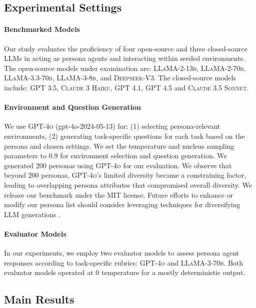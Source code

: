 \subsection{Experimental Settings}

\paragraph{Benchmarked Models}
Our study evaluates the proficiency of four open-source and three closed-source LLMs in acting as persona agents and interacting within seeded environments. The open-source models under examination are: \textsc{LLaMA-2-13b}, \textsc{LLaMA-2-70b}, \textsc{LLaMA-3.3-70b}, \textsc{LLaMA-3-8b}, and \textsc{Deepseek-V3}. The closed-source models include: \textsc{GPT 3.5}, \textsc{Claude 3 Haiku}, \textsc{GPT 4.1}, \textsc{GPT 4.5} and \textsc{Claude 3.5 Sonnet}.

\paragraph{Environment and Question Generation} We use \textsc{GPT-4o} (gpt-4o-2024-05-13) for: (1) selecting persona-relevant environments, (2) generating task-specific questions for each \benchmark task based on the persona and chosen settings. We set the temperature and nucleus sampling parameters to 0.9 for environment selection and question generation. We generated 200 personas using \textsc{GPT-4o} for our evaluation. We observe that beyond 200 personas, \textsc{GPT-4o}'s limited diversity became a constraining factor, leading to overlapping persona attributes that compromised overall diversity. We release our benchmark under the MIT license. Future efforts to enhance or modify our persona list should consider leveraging techniques for diversifying LLM generations \cite{zhang2024forcing}.

\paragraph{Evaluator Models} In our experiments, we employ two evaluator models to assess persona agent responses according to task-specific rubrics: \textsc{GPT-4o} and \textsc{LLaMA-3-70b}. Both evaluator models operated at 0 temperature for a mostly deterministic output.

\subsection{Main Results}

